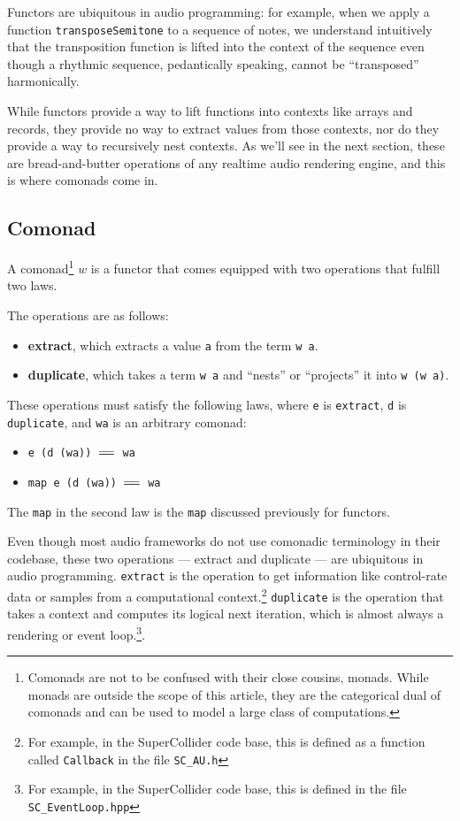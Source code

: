 \documentclass{article}
\begin{document}
Functors are ubiquitous in audio programming: for example, when we apply a function \texttt{transposeSemitone} to a sequence of notes, we understand intuitively that the transposition function is lifted into the context of the sequence even though a rhythmic sequence, pedantically speaking, cannot be ``transposed'' harmonically.

While functors provide a way to lift functions into contexts like arrays and records, they provide no way to extract values from those contexts, nor do they provide a way to recursively nest contexts. As we'll see in the next section, these are bread-and-butter operations of any realtime audio rendering engine, and this is where comonads come in.

\subsection{Comonad}

A comonad\footnote{Comonads are not to be confused with their close cousins, monads. While monads are outside the scope of this article, they are the categorical dual of comonads and can be used to model a large class of computations.} $w$ is a functor that comes equipped with two operations that fulfill two laws.

The operations are as follows:

\begin{itemize}
  \item \textbf{extract}, which extracts a value \texttt{a} from the term \texttt{w a}.
  \item \textbf{duplicate}, which takes a term \texttt{w a} and ``nests'' or ``projects'' it into \texttt{w (w a)}.
\end{itemize}

These operations must satisfy the following laws, where \texttt{e} is \texttt{extract}, \texttt{d} is \texttt{duplicate}, and \texttt{wa} is an arbitrary comonad:

\begin{itemize}
  \item \texttt{e (d (wa)) $=\joinrel=$ wa}
  \item \texttt{map e (d (wa)) $=\joinrel=$ wa}
\end{itemize}

The \verb=map= in the second law is the \verb=map= discussed previously for functors.

Even though most audio frameworks do not use comonadic terminology in their codebase, these two operations --- extract and duplicate --- are ubiquitous in audio programming. \texttt{extract} is the operation to get information like control-rate data or samples from a computational context.\footnote{For example, in the SuperCollider code base, this is defined as a function called \texttt{Callback} in the file \texttt{SC\_AU.h}} \texttt{duplicate} is the operation that takes a context and computes its logical next iteration, which is almost always a rendering or event loop.\footnote{For example, in the SuperCollider code base, this is defined in the file \texttt{SC\_EventLoop.hpp}}.
\end{document}
